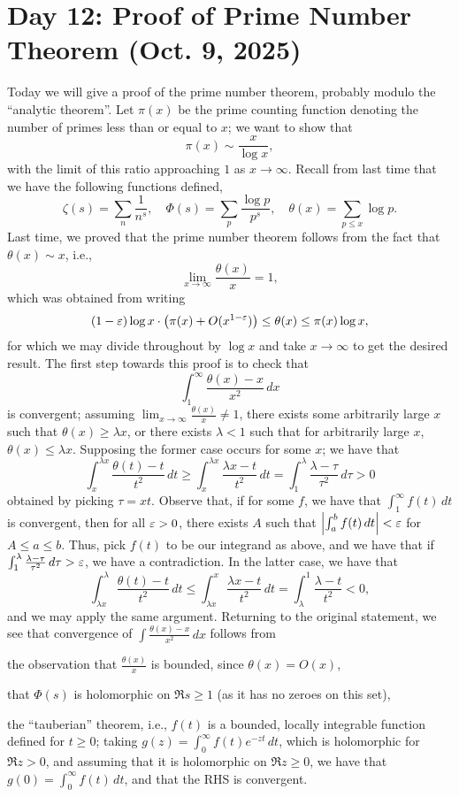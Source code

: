 \setcounter{section}{11}
\section{Day 12: Proof of Prime Number Theorem (Oct. 9, 2025)}
Today we will give a proof of the prime number theorem, probably modulo the ``analytic theorem''. Let $\pi(x)$ be the prime counting function denoting the number of primes less than or equal to $x$; we want to show that
\[ \pi(x) \sim \frac{x}{\log x}, \]
with the limit of this ratio approaching $1$ as $x \to \infty$. Recall from last time that we have the following functions defined,
\[ \zeta(s) = \sum_n \frac{1}{n^s}, \quad \Phi(s) = \sum_p \frac{\log p}{p^s}, \quad \theta(x) = \sum_{p \leq x} \log p. \]
Last time, we proved that the prime number theorem follows from the fact that $\theta(x) \sim x$, i.e.,
\[ \lim_{x \to \infty} \frac{\theta(x)}{x} = 1, \]
which was obtained from writing
\[ (1 - \varepsilon) \log x \cdot \left(\pi(x) + O(x^{1 - \varepsilon})\right) \leq \theta(x) \leq \pi(x) \log x, \]
for which we may divide throughout by $\log x$ and take $x \to \infty$ to get the desired result. The first step towards this proof is to check that
\[ \int_1^\infty \frac{\theta(x) - x}{x^2} \, dx \]
is convergent; assuming $\lim_{x \to \infty} \frac{\theta(x)}{x} \neq 1$, there exists some arbitrarily large $x$ such that $\theta(x) \geq \lambda x$, or there exists $\lambda < 1$ such that for arbitrarily large $x$, $\theta(x) \leq \lambda x$. Supposing the former case occurs for some $x$; we have that
\[ \int_x^{\lambda x} \frac{\theta(t) - t}{t^2} \, dt \geq \int_x^{\lambda x} \frac{\lambda x - t}{t^2} \, dt = \int_1^\lambda \frac{\lambda - \tau}{\tau^2} \, d\tau > 0 \]
obtained by picking $\tau = xt$. Observe that, if for some $f$, we have that $\int_1^\infty f(t) \, dt$ is convergent, then for all $\varepsilon > 0$, there exists $A$ such that $\left\lvert \int_a^b f(t) \, dt \right\rvert < \varepsilon$ for $A \leq a \leq b$. Thus, pick $f(t)$ to be our integrand as above, and we have that if $\int_1^\lambda \frac{\lambda - \tau}{\tau^2} \, d\tau > \varepsilon$, we have a contradiction. In the latter case, we have that
\[ \int_{\lambda x}^\lambda \frac{\theta(t) - t}{t^2} \, dt \leq \int_{\lambda x}^x \frac{\lambda x - t}{t^2} \, dt = \int_\lambda^1 \frac{\lambda - t}{t^2} < 0, \]
and we may apply the same argument. Returning to the original statement, we see that convergence of $\int \frac{\theta(x) - x}{x^2} \, dx$ follows from \begin{parlist} \item the observation that $\frac{\theta(x)}{x}$ is bounded, since $\theta(x) = O(x)$, \item that $\Phi(s)$ is holomorphic on $\Re s \geq 1$ (as it has no zeroes on this set), \item the ``tauberian'' theorem, i.e., $f(t)$ is a bounded, locally integrable function defined for $t \geq 0$; taking $g(z) = \int_0^\infty f(t) e^{-zt} \, dt$, which is holomorphic for $\Re z > 0$, and assuming that it is holomorphic on $\Re z \geq 0$, we have that $g(0) = \int_0^\infty f(t) \, dt$, and that the RHS is convergent. \end{parlist}
